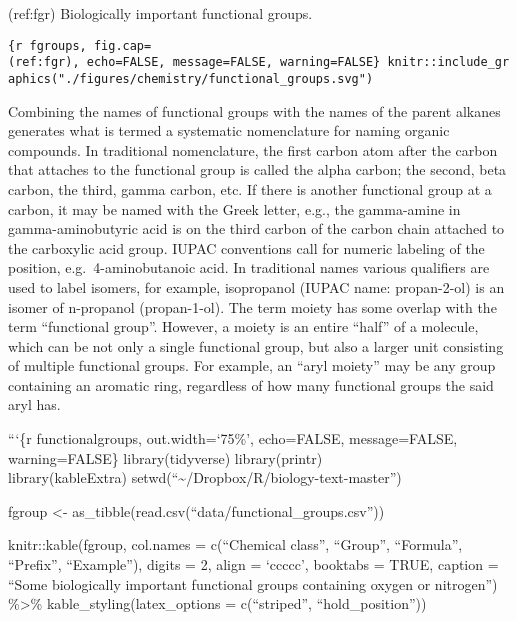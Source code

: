 (ref:fgr) Biologically important functional groups.

\texttt{\{r\ fgroups,\ fig.cap=\textquotesingle{}(ref:fgr)\textquotesingle{},\ echo=FALSE,\ message=FALSE,\ warning=FALSE\}\ knitr::include\_graphics("./figures/chemistry/functional\_groups.svg")}

Combining the names of functional groups with the names of the parent
alkanes generates what is termed a systematic nomenclature for naming
organic compounds. In traditional nomenclature, the first carbon atom
after the carbon that attaches to the functional group is called the
alpha carbon; the second, beta carbon, the third, gamma carbon, etc. If
there is another functional group at a carbon, it may be named with the
Greek letter, e.g., the gamma-amine in gamma-aminobutyric acid is on the
third carbon of the carbon chain attached to the carboxylic acid group.
IUPAC conventions call for numeric labeling of the position,
e.g.~4-aminobutanoic acid. In traditional names various qualifiers are
used to label isomers, for example, isopropanol (IUPAC name:
propan-2-ol) is an isomer of n-propanol (propan-1-ol). The term moiety
has some overlap with the term ``functional group''. However, a moiety
is an entire ``half'' of a molecule, which can be not only a single
functional group, but also a larger unit consisting of multiple
functional groups. For example, an ``aryl moiety'' may be any group
containing an aromatic ring, regardless of how many functional groups
the said aryl has.

```\{r functionalgroups, out.width=`75\%', echo=FALSE, message=FALSE,
warning=FALSE\} library(tidyverse) library(printr)\\
library(kableExtra)
setwd(``\textasciitilde/Dropbox/R/biology-text-master'')

fgroup \textless- as\_tibble(read.csv(``data/functional\_groups.csv''))

knitr::kable(fgroup, col.names = c(``Chemical class'', ``Group'',
``Formula'', ``Prefix'', ``Example''), digits = 2, align = `ccccc',
booktabs = TRUE, caption = ``Some biologically important functional
groups containing oxygen or nitrogen'') \%\textgreater\%
kable\_styling(latex\_options = c(``striped'', ``hold\_position''))

